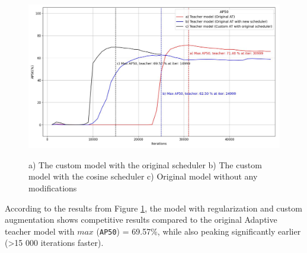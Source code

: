 \begin{figure}[htb]
	\begin{center}
		\includegraphics[width=14cm]{./AP50_myModel_origScheduler.jpg}
	\end{center}
	\caption{a) The custom model with the original scheduler b) The custom model with the cosine scheduler c) Original model without any modifications}
	\begin{center}
		\label{myModel_withOrigSched}
	\end{center}
\end{figure}
\FloatBarrier  

According to the results from Figure \ref{myModel_withOrigSched}, the model with regularization and custom augmentation shows competitive results compared to the original Adaptive teacher model with $max$ (\texttt{AP50}) = 69.57\%, while also peaking significantly earlier (>15 000 iterations faster).  

